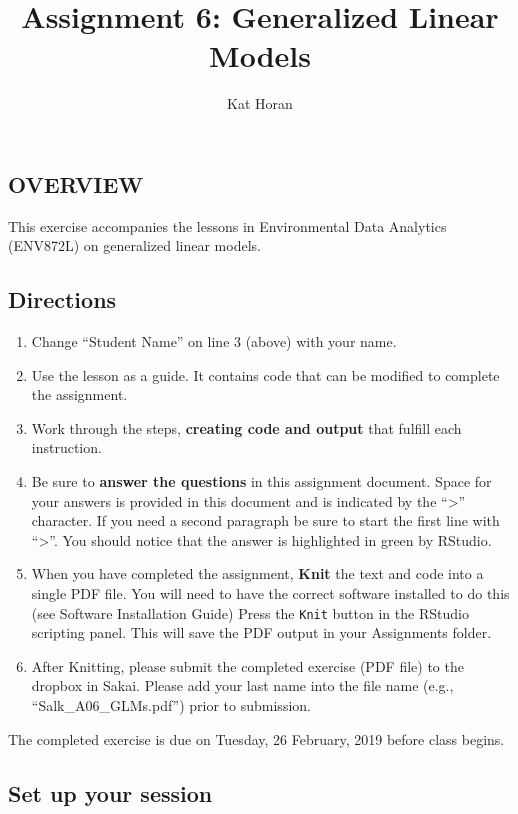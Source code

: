 \documentclass[]{article}
\title{Assignment 6: Generalized Linear Models}
\author{Kat Horan}
\date{}
\providecommand{\tightlist}{%
  \setlength{\itemsep}{0pt}\setlength{\parskip}{0pt}}
\begin{document}
\maketitle

\subsection{OVERVIEW}\label{overview}

This exercise accompanies the lessons in Environmental Data Analytics
(ENV872L) on generalized linear models.

\subsection{Directions}\label{directions}

\begin{enumerate}
\def\labelenumi{\arabic{enumi}.}
\tightlist
\item
  Change ``Student Name'' on line 3 (above) with your name.
\item
  Use the lesson as a guide. It contains code that can be modified to
  complete the assignment.
\item
  Work through the steps, \textbf{creating code and output} that fulfill
  each instruction.
\item
  Be sure to \textbf{answer the questions} in this assignment document.
  Space for your answers is provided in this document and is indicated
  by the ``\textgreater{}'' character. If you need a second paragraph be
  sure to start the first line with ``\textgreater{}''. You should
  notice that the answer is highlighted in green by RStudio.
\item
  When you have completed the assignment, \textbf{Knit} the text and
  code into a single PDF file. You will need to have the correct
  software installed to do this (see Software Installation Guide) Press
  the \texttt{Knit} button in the RStudio scripting panel. This will
  save the PDF output in your Assignments folder.
\item
  After Knitting, please submit the completed exercise (PDF file) to the
  dropbox in Sakai. Please add your last name into the file name (e.g.,
  ``Salk\_A06\_GLMs.pdf'') prior to submission.
\end{enumerate}

The completed exercise is due on Tuesday, 26 February, 2019 before class
begins.

\subsection{Set up your session}\label{set-up-your-session}
\end{document}
